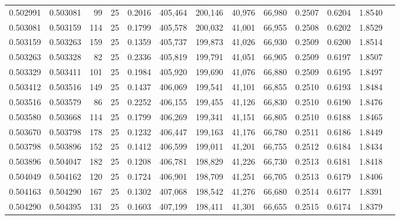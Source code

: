 \begin{tabular}{rrrrrrrrrrrrr}
0.502991 & 0.503081 &    99 &  25 &                                     0.2016 & 405,464 & 200,146 &  40,976 &  66,980 & 0.2507 & 0.6204 & 1.8540 \\
0.503081 & 0.503159 &   114 &  25 &                                     0.1799 & 405,578 & 200,032 &  41,001 &  66,955 & 0.2508 & 0.6202 & 1.8529 \\
0.503159 & 0.503263 &   159 &  25 &                                     0.1359 & 405,737 & 199,873 &  41,026 &  66,930 & 0.2509 & 0.6200 & 1.8514 \\
0.503263 & 0.503328 &    82 &  25 &                                     0.2336 & 405,819 & 199,791 &  41,051 &  66,905 & 0.2509 & 0.6197 & 1.8507 \\
0.503329 & 0.503411 &   101 &  25 &                                     0.1984 & 405,920 & 199,690 &  41,076 &  66,880 & 0.2509 & 0.6195 & 1.8497 \\
0.503412 & 0.503516 &   149 &  25 &                                     0.1437 & 406,069 & 199,541 &  41,101 &  66,855 & 0.2510 & 0.6193 & 1.8484 \\
0.503516 & 0.503579 &    86 &  25 &                                     0.2252 & 406,155 & 199,455 &  41,126 &  66,830 & 0.2510 & 0.6190 & 1.8476 \\
0.503580 & 0.503668 &   114 &  25 &                                     0.1799 & 406,269 & 199,341 &  41,151 &  66,805 & 0.2510 & 0.6188 & 1.8465 \\
0.503670 & 0.503798 &   178 &  25 &                                     0.1232 & 406,447 & 199,163 &  41,176 &  66,780 & 0.2511 & 0.6186 & 1.8449 \\
0.503798 & 0.503896 &   152 &  25 &                                     0.1412 & 406,599 & 199,011 &  41,201 &  66,755 & 0.2512 & 0.6184 & 1.8434 \\
0.503896 & 0.504047 &   182 &  25 &                                     0.1208 & 406,781 & 198,829 &  41,226 &  66,730 & 0.2513 & 0.6181 & 1.8418 \\
0.504049 & 0.504162 &   120 &  25 &                                     0.1724 & 406,901 & 198,709 &  41,251 &  66,705 & 0.2513 & 0.6179 & 1.8406 \\
0.504163 & 0.504290 &   167 &  25 &                                     0.1302 & 407,068 & 198,542 &  41,276 &  66,680 & 0.2514 & 0.6177 & 1.8391 \\
0.504290 & 0.504395 &   131 &  25 &                                     0.1603 & 407,199 & 198,411 &  41,301 &  66,655 & 0.2515 & 0.6174 & 1.8379 \\

\end{tabular}

